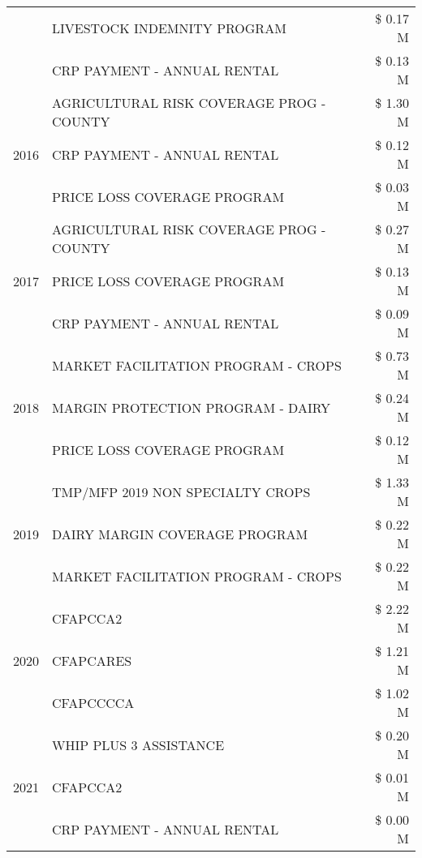 \begin{tabular}{llr}
 & LIVESTOCK INDEMNITY PROGRAM & \$ 0.17 M \\
 & CRP PAYMENT - ANNUAL RENTAL & \$ 0.13 M \\
\cline{1-3}
\multirow[t]{3}{*}{2016} & AGRICULTURAL RISK COVERAGE PROG - COUNTY & \$ 1.30 M \\
 & CRP PAYMENT - ANNUAL RENTAL & \$ 0.12 M \\
 & PRICE LOSS COVERAGE PROGRAM & \$ 0.03 M \\
\cline{1-3}
\multirow[t]{3}{*}{2017} & AGRICULTURAL RISK COVERAGE PROG - COUNTY & \$ 0.27 M \\
 & PRICE LOSS COVERAGE PROGRAM & \$ 0.13 M \\
 & CRP PAYMENT - ANNUAL RENTAL & \$ 0.09 M \\
\cline{1-3}
\multirow[t]{3}{*}{2018} & MARKET FACILITATION PROGRAM - CROPS & \$ 0.73 M \\
 & MARGIN PROTECTION PROGRAM - DAIRY & \$ 0.24 M \\
 & PRICE LOSS COVERAGE PROGRAM & \$ 0.12 M \\
\cline{1-3}
\multirow[t]{3}{*}{2019} & TMP/MFP 2019 NON SPECIALTY CROPS & \$ 1.33 M \\
 & DAIRY MARGIN COVERAGE PROGRAM & \$ 0.22 M \\
 & MARKET FACILITATION PROGRAM - CROPS & \$ 0.22 M \\
\cline{1-3}
\multirow[t]{3}{*}{2020} & CFAPCCA2 & \$ 2.22 M \\
 & CFAPCARES & \$ 1.21 M \\
 & CFAPCCCCA & \$ 1.02 M \\
\cline{1-3}
\multirow[t]{3}{*}{2021} & WHIP PLUS 3 ASSISTANCE & \$ 0.20 M \\
 & CFAPCCA2 & \$ 0.01 M \\
 & CRP PAYMENT - ANNUAL RENTAL & \$ 0.00 M \\
\cline{1-3}
\bottomrule
\end{tabular}
